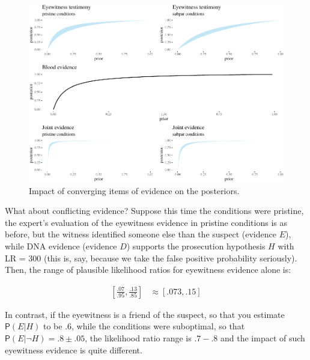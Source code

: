 \documentclass[10pt,dvipsnames,enabledeprecatedfontcommands]{scrartcl}
\newcommand{\n}{\neg}
\newcommand{\pr}[1]{\mathsf{P}(#1)}
\begin{document}
\begin{figure}[h]

\begin{center}\includegraphics[width=1\linewidth]{lr-chapter3_files/figure-latex/eyewitness2-1} \end{center}
\caption{Impact of converging items of  evidence on the posteriors.}
\label{fig:eyewitness3}
\end{figure}

What about conflicting evidence? Suppose this time the conditions were
pristine, the expert's evaluation of the eyewitness evidence in pristine
conditions is as before, but the witness identified someone else than
the suspect (evidence \(E\)), while DNA evidence (evidence \(D\))
supports the prosecution hypothesis \(H\) with \textsf{LR} = 300 (this
is, say, because we take the false positive probability seriously).
Then, the range of plausible likelihood ratios for eyewitness evidence
alone is:

\begin{align*}
\left[\frac{.07}{.95}, \frac{.13}{.85}    \right ]  & \approx [.073,.15]
\end{align*}

In contrast, if the eyewitness is a friend of the suspect, so that you
estimate \(\pr{E \vert H}\) to be .6, while the conditions were
suboptimal, so that \(\pr{E\vert \n H} = .8\pm .05\), the likelihood
ratio range is \(.7-.8\) and the impact of such eyewitness evidence is
quite different.

\vspace{1mm} \footnotesize

\normalsize
\end{document}
